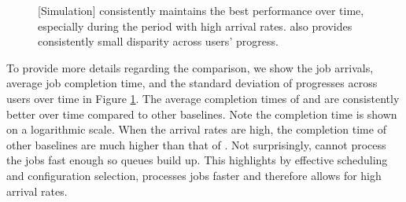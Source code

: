 \begin{figure}[h]
	\centering
	\vspace{-1in}
	\caption{[Simulation] \name consistently maintains the best performance over time, especially during the period with high arrival rates. \name also provides consistently small disparity across users' progress.}
	\label{fig:perf_overtime}
\end{figure}

To provide more details regarding the comparison, we show the job arrivals, average job completion time, and the standard deviation of progresses across users over time in Figure \ref{fig:perf_overtime}.
The average completion times of \name and \SRPT are consistently better over time compared to other baselines. Note the completion time is shown on a logarithmic scale.
When the arrival rates are high, the completion time of other baselines are much higher than that of \name. Not surprisingly, \DRFFIFO cannot process the jobs fast enough so queues build up. 
This highlights by effective scheduling and configuration selection, \name processes jobs faster and therefore allows for high arrival rates. %

